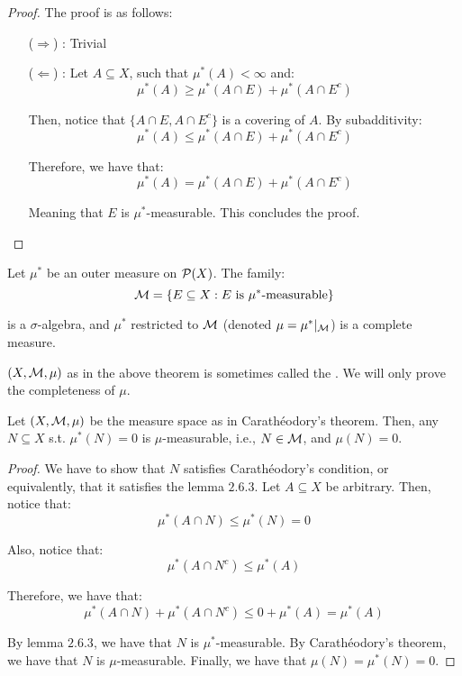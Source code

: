 \begin{proof}
    The proof is as follows:
    \begin{itemize}
        \item[($\Rightarrow$)]: Trivial
        \item[($\Leftarrow$)]: Let $A \subseteq X$, such that $\mu^{*}(A) < \infty$ and:
        $$\mu^{*}(A) \geq \mu^{*}(A \cap E) + \mu^{*}(A \cap E^c)$$

        Then, notice that $\{A \cap E, A \cap E^c\}$ is a covering of $A$. By subadditivity:
        $$\mu^{*}(A) \leq \mu^{*}(A \cap E) + \mu^{*}(A \cap E^c)$$

        Therefore, we have that:
        $$\mu^{*}(A) = \mu^{*}(A \cap E) + \mu^{*}(A \cap E^c)$$

        Meaning that $E$ is $\mu^{*}$-measurable. This concludes the proof.
    \end{itemize}
\end{proof}

\begin{ftheorem}[Carathéodory]
    Let $\mu^{*}$ be an outer measure on $\mathcal{P}(X)$. The family:
    $$\mathcal{M} = \{E \subseteq X: E \text{ is } \mu^{*}\text{-measurable}\}$$

    is a $\sigma$-algebra, and $\mu^{*}$ restricted to $\mathcal{M}$ (denoted $\mu = \mu^{*} |_{\mathcal{M}}$)
    is a complete measure.
\end{ftheorem}

\vspace{1em}

\begin{fremark}
    $(X, \mathcal{M}, \mu)$ as in the above theorem is sometimes called the .
    We will only prove the completeness of $\mu$.
\end{fremark}

\vspace{1em}

\begin{flemma}
    Let $(X, \mathcal{M}, \mu)$ be the measure space as in Carathéodory's theorem. Then, any $N \subseteq X$
    s.t. $\mu^{*}(N) = 0$ is $\mu$-measurable, i.e., $N \in \mathcal{M}$, and $\mu(N) = 0$.
\end{flemma}

\begin{proof}
    We have to show that $N$ satisfies Carathéodory's condition, or equivalently, that it
    satisfies the lemma $2.6.3$. Let $A \subseteq X$ be arbitrary. Then, notice that:
    $$\mu^{*}(A \cap N) \leq \mu^{*}(N) = 0$$

    Also, notice that:
    $$\mu^{*}(A \cap N^c) \leq \mu^{*}(A)$$

    Therefore, we have that:
    $$\mu^{*}(A \cap N) + \mu^{*}(A \cap N^c) \leq 0 + \mu^{*}(A) = \mu^{*}(A)$$

    By lemma $2.6.3$, we have that $N$ is $\mu^{*}$-measurable. By Carathéodory's theorem, we 
    have that $N$ is $\mu$-measurable. Finally, we have that $\mu(N) = \mu^{*}(N) = 0$.

\end{proof}

